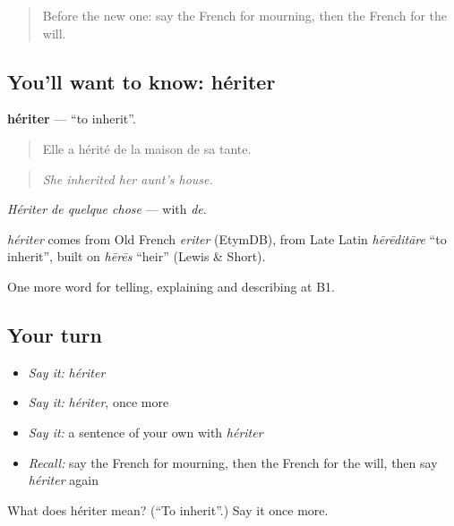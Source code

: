 \begin{quote}
Before the new one: say the French for mourning, then the French for the will.
\end{quote}

\subsection*{You'll want to know: hériter}
\textbf{hériter} — \textquotedblleft{}to inherit\textquotedblright{}.

\begin{quote}
Elle a hérité de la maison de sa tante.
\end{quote}

\begin{quote}
\emph{She inherited her aunt's house.}
\end{quote}

\emph{Hériter de quelque chose} — with \emph{de}.

\begin{cousinweb}
\emph{hériter} comes from Old French \emph{eriter} (EtymDB), from Late Latin \emph{hērēditāre} \textquotedblleft{}to inherit\textquotedblright{}, built on \emph{hērēs} \textquotedblleft{}heir\textquotedblright{} (Lewis \& Short).
\end{cousinweb}

\begin{grammarlens}[title={What you've built}]
One more word for telling, explaining and describing at B1.
\end{grammarlens}

\subsection*{Your turn}
\begin{itemize}
\raggedright
  \item \emph{Say it:} \emph{hériter}
  \item \emph{Say it:} \emph{hériter}, once more
  \item \emph{Say it:} a sentence of your own with \emph{hériter}
  \item \emph{Recall:} say the French for mourning, then the French for the will, then say \emph{hériter} again
\end{itemize}

\begin{tcolorbox}[breakable,colback=teal!4,colframe=teal!35!black,title={Before you move on}]
What does hériter mean? (\textquotedblleft{}To inherit\textquotedblright{}.) Say it once more.
\end{tcolorbox}
